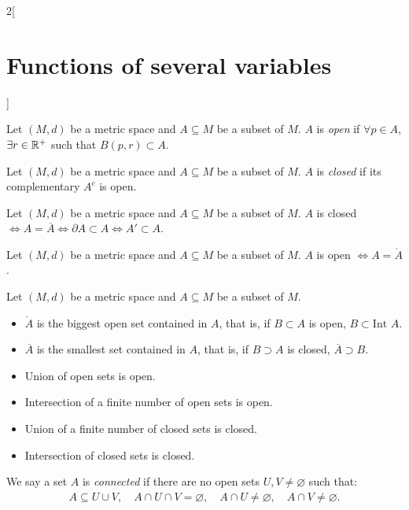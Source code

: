 \documentclass[../../../main.tex]{subfiles}
\begin{document}
\begin{multicols}{2}[\section{Functions of several variables}]
\begin{definition}
        Let $(M,d)$ be a metric space and $A\subseteq M$ be a subset of $M$. $A$ is \textit{open} if $\forall p\in A$, $\exists r\in\mathbb{R}^+$ such that $B(p,r)\subset A$.
    \end{definition}
    \begin{definition}
        Let $(M,d)$ be a metric space and $A\subseteq M$ be a subset of $M$. $A$ is \textit{closed} if its complementary $A^c$ is open.
    \end{definition}
    \begin{prop}
        Let $(M,d)$ be a metric space and $A\subseteq M$ be a subset of $M$. $A$ is closed $\iff A=\overline{A}\iff\partial A\subset A\iff A'\subset A$.
    \end{prop}
    \begin{prop}
        Let $(M,d)$ be a metric space and $A\subseteq M$ be a subset of $M$. $A$ is open $\iff A=\mathring A$.
    \end{prop}
    \begin{prop}
        Let $(M,d)$ be a metric space and $A\subseteq M$ be a subset of $M$.
        \begin{itemize}
            \item $\mathring A$ is the biggest open set contained in $A$, that is, if $B\subset A$ is open, $B\subset\text{Int }A$.
            \item $\overline{A}$ is the smallest set contained in $A$, that is, if $B\supset A$ is closed, $\overline{A}\supset B$.
        \end{itemize}
    \end{prop}
    \begin{prop}
        \hfill
        \begin{itemize}
            \item Union of open sets is open.
            \item Intersection of a finite number of open sets is open.
            \item Union of a finite number of closed sets is closed.
            \item Intersection of closed sets is closed.
        \end{itemize}
    \end{prop}
    \begin{definition}
        We say a set $A$ is \textit{connected} if there are no open sets $U,V\ne\varnothing$ such that:
        \begin{gather*}
            A\subseteq U\cup V,\quad A\cap U\cap V=\varnothing,\quad A\cap U\ne\varnothing,\quad A\cap V\ne\varnothing.

\end{gather*}
\end{definition}
\end{multicols}
\end{document}
